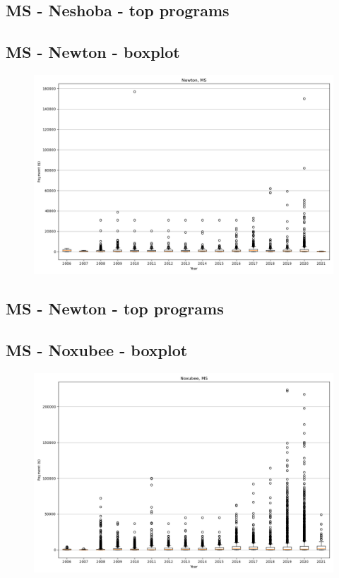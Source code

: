 \subsection*{MS - Neshoba - top programs}

\newpage
\subsection*{MS - Newton - boxplot}
\begin{figure}[h]
\centering
\includegraphics[width=7in]{../output/boxplots/counties/Newton-MS_boxplot.png}
\end{figure}


\subsection*{MS - Newton - top programs}

\newpage
\subsection*{MS - Noxubee - boxplot}
\begin{figure}[h]
\centering
\includegraphics[width=7in]{../output/boxplots/counties/Noxubee-MS_boxplot.png}
\end{figure}


